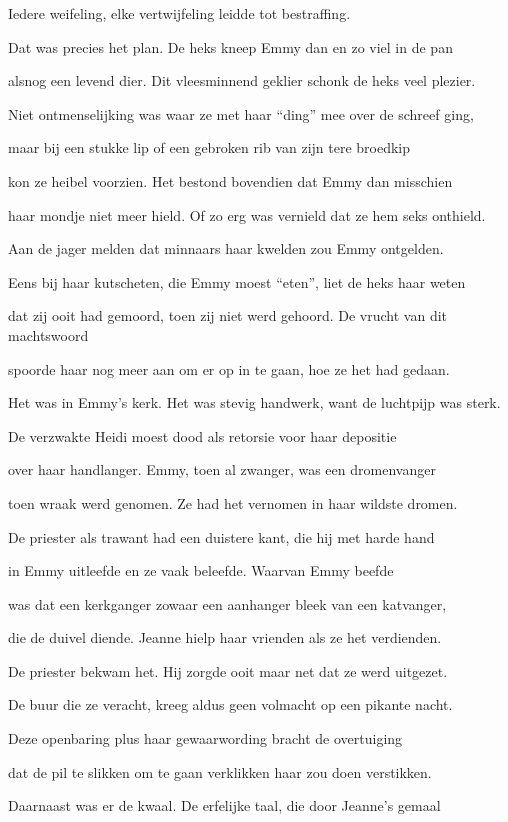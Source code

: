 Iedere weifeling,
elke vertwijfeling
leidde tot bestraffing.

Dat was precies het plan.
De heks kneep Emmy dan
en zo viel in de pan

alsnog een levend dier.
Dit vleesminnend geklier
schonk de heks veel plezier.

Niet ontmenselijking
was waar ze met haar “ding” mee over de schreef ging,

maar bij een stukke lip
of een gebroken rib
van zijn tere broedkip

kon ze heibel voorzien.
Het bestond bovendien
dat Emmy dan misschien

haar mondje niet meer hield.
Of zo erg was vernield
dat ze hem seks onthield.

Aan de jager melden
dat minnaars haar kwelden
zou Emmy ontgelden.

Eens bij haar kutscheten,
die Emmy moest “eten”,
liet de heks haar weten

dat zij ooit had gemoord,
toen zij niet werd gehoord.
De vrucht van dit machtswoord

spoorde haar nog meer aan
om er op in te gaan,
hoe ze het had gedaan.

Het was in Emmy's kerk.
Het was stevig handwerk,
want de luchtpijp was sterk.

De verzwakte Heidi
moest dood als retorsie
voor haar depositie

over haar handlanger.
Emmy, toen al zwanger,
was een dromenvanger

toen wraak werd genomen.
Ze had het vernomen
in haar wildste dromen.

De priester als trawant
had een duistere kant,
die hij met harde hand

in Emmy uitleefde
en ze vaak beleefde.
Waarvan Emmy beefde

was dat een kerkganger
zowaar een aanhanger
bleek van een katvanger,

die de duivel diende.
Jeanne hielp haar vrienden
als ze het verdienden.

De priester bekwam het.
Hij zorgde ooit maar net
dat ze werd uitgezet.

De buur die ze veracht,
kreeg aldus geen volmacht
op een pikante nacht.

Deze openbaring
plus haar gewaarwording
bracht de overtuiging

dat de pil te slikken
om te gaan verklikken
haar zou doen verstikken.

Daarnaast was er de kwaal.
De erfelijke taal,
die door Jeanne’s gemaal

